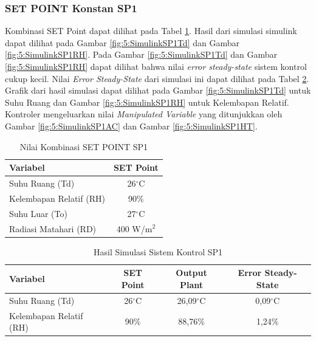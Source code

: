 \subsubsection{SET POINT Konstan SP1}

Kombinasi SET Point dapat dilihat pada Tabel \ref{tbl:5:SP1Combination}. Hasil dari simulasi simulink dapat dilihat pada Gambar \ref{fig:5:SimulinkSP1Td} dan Gambar \ref{fig:5:SimulinkSP1RH}. Pada Gambar \ref{fig:5:SimulinkSP1Td} dan Gambar \ref{fig:5:SimulinkSP1RH} dapat dilihat bahwa nilai \textit{error steady-state} sistem kontrol cukup kecil. Nilai \textit{Error Steady-State} dari simulasi ini dapat dilihat pada Tabel \ref{tbl:5:SP1Ess}. Grafik dari hasil simulasi dapat dilihat pada Gambar \ref{fig:5:SimulinkSP1Td} untuk Suhu Ruang dan Gambar \ref{fig:5:SimulinkSP1RH} untuk Kelembapan Relatif. Kontroler mengeluarkan nilai \textit{Manipulated Variable} yang ditunjukkan oleh Gambar \ref{fig:5:SimulinkSP1AC} dan Gambar \ref{fig:5:SimulinkSP1HT}.\\

\vspace{0.5em}
\begin{table}[!h]
	\caption{Nilai Kombinasi SET POINT SP1}
	\label{tbl:5:SP1Combination}
	\centering
	\begin{tabular}{|l|c|}
		\hline
		\textbf{Variabel} & \textbf{SET Point} \\ \hline
		Suhu Ruang (Td) & 26$^\circ$C          \\ \hline
		Kelembapan Relatif (RH) & 90\%         \\ \hline
		Suhu Luar (To) & 27$^\circ$C           \\ \hline
		Radiasi Matahari (RD) & 400 W/m$^2$    \\ \hline
	\end{tabular}
\end{table}

\vspace{0.5em}
\begin{table}[!h]
	\caption{Hasil Simulasi Sistem Kontrol SP1}
	\label{tbl:5:SP1Ess}
	\centering
	\begin{tabular}{|l|c|c|c|}
		\hline
		\textbf{Variabel} & \textbf{SET Point} & \textbf{Output Plant} & \textbf{Error Steady-State}\\ \hline
		Suhu Ruang (Td) & 26$^\circ$C & 26,09$^\circ$C & 0,09$^\circ$C \\ \hline
		Kelembapan Relatif (RH) & 90\% & 88,76\% & 1,24\% \\ \hline
	\end{tabular}
\end{table}

